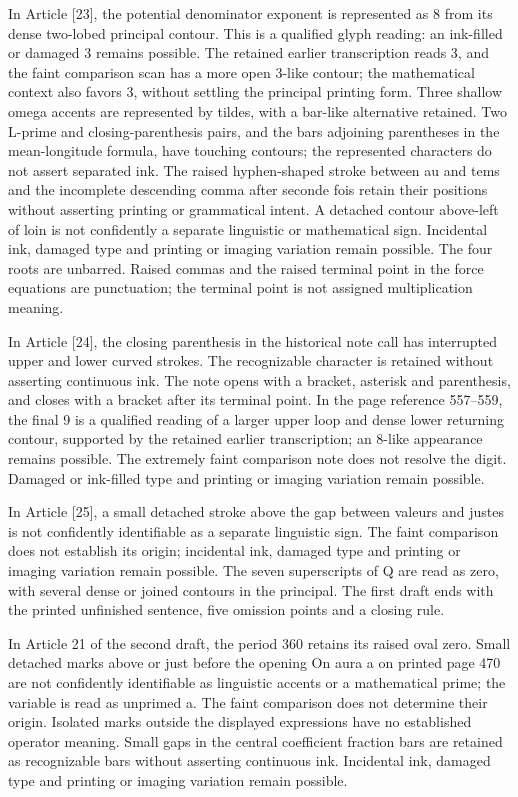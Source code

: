 In Article [23], the potential denominator exponent is represented as 8 from its dense two-lobed principal contour. This is a qualified glyph reading: an ink-filled or damaged 3 remains possible. The retained earlier transcription reads 3, and the faint comparison scan has a more open 3-like contour; the mathematical context also favors 3, without settling the principal printing form. Three shallow omega accents are represented by tildes, with a bar-like alternative retained. Two L-prime and closing-parenthesis pairs, and the bars adjoining parentheses in the mean-longitude formula, have touching contours; the represented characters do not assert separated ink. The raised hyphen-shaped stroke between au and tems and the incomplete descending comma after seconde fois retain their positions without asserting printing or grammatical intent. A detached contour above-left of loin is not confidently a separate linguistic or mathematical sign. Incidental ink, damaged type and printing or imaging variation remain possible. The four roots are unbarred. Raised commas and the raised terminal point in the force equations are punctuation; the terminal point is not assigned multiplication meaning.

In Article [24], the closing parenthesis in the historical note call has interrupted upper and lower curved strokes. The recognizable character is retained without asserting continuous ink. The note opens with a bracket, asterisk and parenthesis, and closes with a bracket after its terminal point. In the page reference 557–559, the final 9 is a qualified reading of a larger upper loop and dense lower returning contour, supported by the retained earlier transcription; an 8-like appearance remains possible. The extremely faint comparison note does not resolve the digit. Damaged or ink-filled type and printing or imaging variation remain possible.

In Article [25], a small detached stroke above the gap between valeurs and justes is not confidently identifiable as a separate linguistic sign. The faint comparison does not establish its origin; incidental ink, damaged type and printing or imaging variation remain possible. The seven superscripts of Q are read as zero, with several dense or joined contours in the principal. The first draft ends with the printed unfinished sentence, five omission points and a closing rule.

In Article 21 of the second draft, the period 360 retains its raised oval zero. Small detached marks above or just before the opening On aura a on printed page 470 are not confidently identifiable as linguistic accents or a mathematical prime; the variable is read as unprimed a. The faint comparison does not determine their origin. Isolated marks outside the displayed expressions have no established operator meaning. Small gaps in the central coefficient fraction bars are retained as recognizable bars without asserting continuous ink. Incidental ink, damaged type and printing or imaging variation remain possible.

